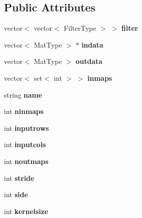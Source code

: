 \subsection*{Public Attributes}
\begin{DoxyCompactItemize}
\item 
\hypertarget{class_conv_layer_a3fbf8929ebf39d70281c548653159fe1}{vector$<$ vector$<$ Filter\+Type $>$ $>$ {\bfseries filter}}\label{class_conv_layer_a3fbf8929ebf39d70281c548653159fe1}

\item 
\hypertarget{class_conv_layer_ae90ccdaf98509ac518dc8158abb53540}{vector$<$ Mat\+Type $>$ $\ast$ {\bfseries indata}}\label{class_conv_layer_ae90ccdaf98509ac518dc8158abb53540}

\item 
\hypertarget{class_conv_layer_a41e52948623d345d93ddf7e3e6d4098c}{vector$<$ Mat\+Type $>$ {\bfseries outdata}}\label{class_conv_layer_a41e52948623d345d93ddf7e3e6d4098c}

\item 
\hypertarget{class_conv_layer_a2a829e399b291ef09856b71484ddcade}{vector$<$ set$<$ int $>$ $>$ {\bfseries inmaps}}\label{class_conv_layer_a2a829e399b291ef09856b71484ddcade}

\item 
\hypertarget{class_conv_layer_a9c41797df74c1eef60fb4fdbf2713379}{string {\bfseries name}}\label{class_conv_layer_a9c41797df74c1eef60fb4fdbf2713379}

\item 
\hypertarget{class_conv_layer_acb85ab98fd2db9263870fd1c165ee87f}{int {\bfseries ninmaps}}\label{class_conv_layer_acb85ab98fd2db9263870fd1c165ee87f}

\item 
\hypertarget{class_conv_layer_ac7f12b6aa66204da6672c2f497cad59a}{int {\bfseries inputrows}}\label{class_conv_layer_ac7f12b6aa66204da6672c2f497cad59a}

\item 
\hypertarget{class_conv_layer_afa9b48e7f3f4fcb0d917356aa1684665}{int {\bfseries inputcols}}\label{class_conv_layer_afa9b48e7f3f4fcb0d917356aa1684665}

\item 
\hypertarget{class_conv_layer_a949f5a023803b2fe0e5edbe8d589c414}{int {\bfseries noutmaps}}\label{class_conv_layer_a949f5a023803b2fe0e5edbe8d589c414}

\item 
\hypertarget{class_conv_layer_a7fbd91b7f63e49fb43fa931de225c280}{int {\bfseries stride}}\label{class_conv_layer_a7fbd91b7f63e49fb43fa931de225c280}

\item 
\hypertarget{class_conv_layer_a941ec7552673506cbb7580e41e982494}{int {\bfseries side}}\label{class_conv_layer_a941ec7552673506cbb7580e41e982494}

\item 
\hypertarget{class_conv_layer_a93289a2dd373c9bde48114146ada7117}{int {\bfseries kernelsize}}\label{class_conv_layer_a93289a2dd373c9bde48114146ada7117}

\end{DoxyCompactItemize}


